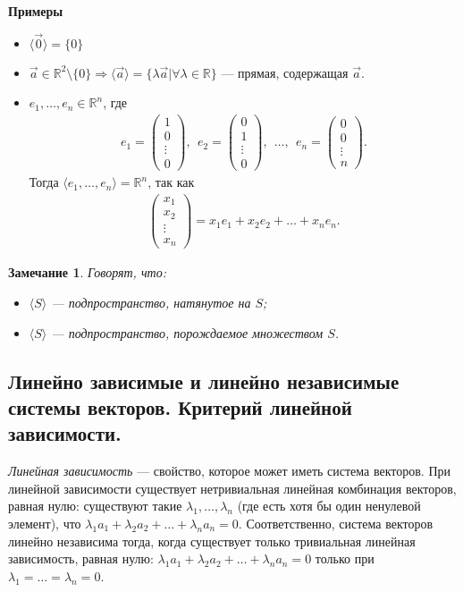 \documentclass[a4paper, 12pt]{article}
\newtheorem*{note}{Замечание}
\newcommand{\bbR}[0]{\mathbb{R}}
\begin{document}
\textbf{Примеры}
\begin{itemize}
\item $\langle \vec{0} \rangle = \{0\}$
\item $\vec{a} \in \bbR^2\setminus\{0\} \Rightarrow \langle \vec{a} \rangle = \{\lambda \vec{a}| \forall \lambda \in \bbR \}$ — прямая, содержащая $\vec{a}$.
\item $e_1, \ldots, e_n \in \bbR^n$, где 
\begin{gather*}
e_1 = 
\begin{pmatrix}
1 \\
0 \\
\vdots \\
0
\end{pmatrix}, \ \ 
e_2 = 
\begin{pmatrix}
0 \\
1 \\
\vdots \\
0
\end{pmatrix}, \ \ \ldots, \ \  
e_n = 
\begin{pmatrix}
0 \\
0 \\
\vdots \\
n
\end{pmatrix}.
\end{gather*}
Тогда $\langle e_1, \ldots, e_n \rangle = \bbR^n$, так как
\begin{gather*}
\begin{pmatrix}
x_1 \\
x_2 \\
\vdots \\
x_n
\end{pmatrix} = x_1e_1 + x_2 e_2 + \ldots + x_n e_n.
\end{gather*}
\end{itemize}

\begin{note}
Говорят, что:
\begin{itemize}
\item $\langle S \rangle$ — подпространство, натянутое на $S$;
\item $\langle S \rangle$ — подпространство, порождаемое множеством $S$.
\end{itemize}
\end{note}

\subsection{Линейно зависимые и линейно независимые системы векторов. Критерий линейной зависимости.}
\emph{Линейная зависимость} --- свойство, которое может иметь система векторов. При линейной зависимости существует нетривиальная линейная комбинация векторов, равная нулю: существуют такие $\lambda_1, \ldots, \lambda_n$ (где есть хотя бы один ненулевой элемент), что $\lambda_1a_1 + \lambda_2a_2 + \ldots + \lambda_na_n = 0$. Соответственно, система векторов линейно независима тогда, когда существует только тривиальная линейная зависимость, равная нулю: $\lambda_1a_1 + \lambda_2a_2 + \ldots + \lambda_n a_n = 0$ только при $\lambda_1= \ldots= \lambda_n = 0$.
\end{document}

